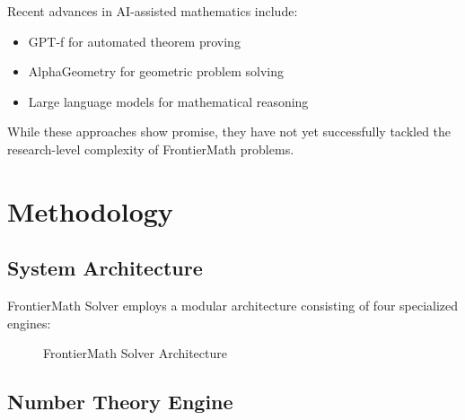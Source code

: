 \documentclass[11pt]{article}
\begin{document}
Recent advances in AI-assisted mathematics include:

\begin{itemize}
\item GPT-f for automated theorem proving \cite{polu2020}
\item AlphaGeometry for geometric problem solving \cite{trinh2024}
\item Large language models for mathematical reasoning \cite{hendrycks2021}
\end{itemize}

While these approaches show promise, they have not yet successfully tackled the research-level complexity of FrontierMath problems.

\section{Methodology}

\subsection{System Architecture}

FrontierMath Solver employs a modular architecture consisting of four specialized engines:

\begin{figure}[h]
\centering
{}
\caption{FrontierMath Solver Architecture}
\end{figure}

\subsection{Number Theory Engine}
\end{document}
